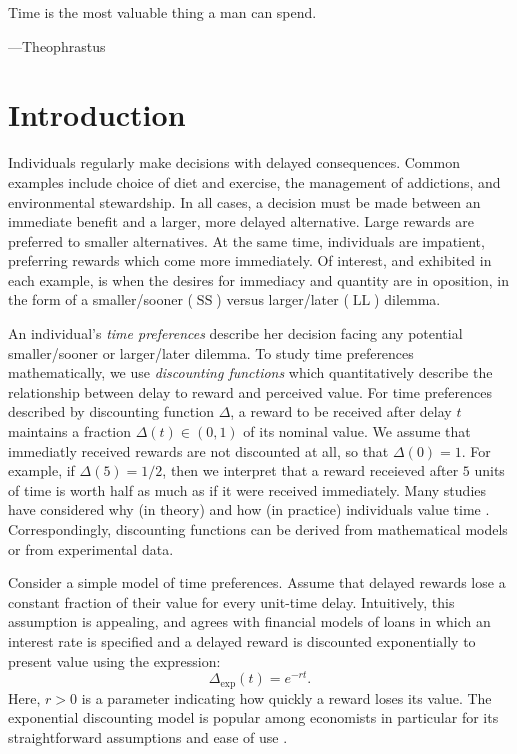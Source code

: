 \documentclass[titlepage, hidelinks, 12pt]{article}
\theoremstyle{plain}
\theoremstyle{remark}
\theoremstyle{definition}
\DeclareMathOperator{\smallersooner}{SS}
\DeclareMathOperator{\largerlater}{LL}
\begin{document}
\epigraph{Time is the most valuable thing a man can spend.}{---Theophrastus}
\linenumbers
\section{Introduction}


Individuals regularly make decisions with delayed consequences. 
Common examples include choice of diet and 
exercise, the management of addictions, and environmental stewardship. 
In all cases, a decision must be made between an immediate benefit and a larger, more delayed alternative.
Large rewards are preferred to smaller alternatives. At the same time, 
individuals are impatient, preferring rewards which come more immediately.
Of interest, and exhibited in each example, is when the desires for immediacy and quantity are in oposition, in the form of 
a smaller/sooner ($\smallersooner$) versus larger/later ($\largerlater$) dilemma. 

An individual's \textit{time preferences} describe her decision facing any potential smaller/sooner or larger/later dilemma. 
To study time preferences mathematically, we use \textit{discounting functions} which quantitatively describe the relationship between
delay to reward and perceived value. For time preferences described by discounting function $\Delta$, 
a reward to be received after delay $t$ maintains a fraction $\Delta(t)\in(0, 1)$ of its nominal value. We assume that immediatly received
rewards are not discounted at all, so that $\Delta(0) = 1$. For example, if $\Delta(5) = 1/2$, then we interpret that a reward receieved
after $5$ units of time is worth half as much as if it were received immediately. Many studies
have considered why (in theory) and how (in practice) individuals value time \cite{mazur85, ainslie75, green81, green04}. 
Correspondingly, discounting functions
can be derived from mathematical models or from experimental data. 

Consider a simple model of time preferences.
Assume that delayed rewards lose a constant fraction of their value for every unit-time delay. Intuitively, this assumption is appealing,
and agrees with financial models of loans in which an interest rate is specified and a delayed reward is discounted exponentially
to present value using the expression:
\begin{equation}
    \Delta_{\exp}(t) = e^{-r t}.
\end{equation}
Here, $r>0$ is a parameter indicating how quickly a reward loses its value. The exponential discounting model is popular among economists in particular
for its straightforward assumptions and ease of use \cite{sozou98}. 
\end{document}
